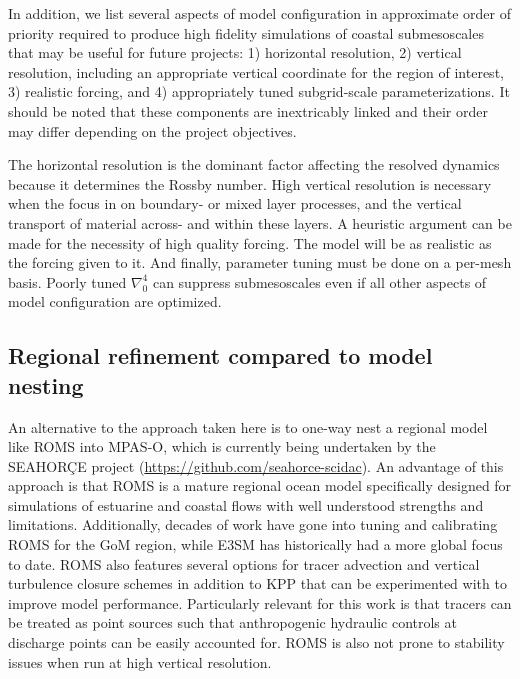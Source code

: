 In addition, we list several aspects of model configuration in approximate order of priority required to produce high fidelity simulations of coastal submesoscales that may be useful for future projects: 1) horizontal resolution, 2) vertical resolution, including an appropriate vertical coordinate for the region of interest, 3) realistic forcing, and 4) appropriately tuned subgrid-scale parameterizations. It should be noted that these components are inextricably linked and their order may differ depending on the project objectives. 

The horizontal resolution is the dominant factor affecting the resolved dynamics because it determines the Rossby number. High vertical resolution is necessary when the focus in on boundary- or mixed layer processes, and the vertical transport of material across- and within these layers. A heuristic argument can be made for the necessity of high quality forcing. The model will be as realistic as the forcing given to it. And finally, parameter tuning must be done on a per-mesh basis. Poorly tuned $\nabla_0^4$ can suppress submesoscales even if all other aspects of model configuration are optimized.

\subsection{Regional refinement compared to model nesting}
An alternative to the approach taken here is to one-way nest a regional model like ROMS into MPAS-O, which is currently being undertaken by the SEAHOR\c{C}E project (\url{https://github.com/seahorce-scidac}). An advantage of this approach is that ROMS is a mature regional ocean model specifically designed for simulations of estuarine and coastal flows with well understood strengths and limitations. Additionally, decades of work have gone into tuning and calibrating ROMS for the GoM region, while E3SM has historically had a more global focus to date. ROMS also features several options for tracer advection and vertical turbulence closure schemes in addition to KPP that can be experimented with to improve model performance. Particularly relevant for this work is that tracers can be treated as point sources such that anthropogenic hydraulic controls at discharge points can be easily accounted for. ROMS is also not prone to stability issues when run at high vertical resolution.

